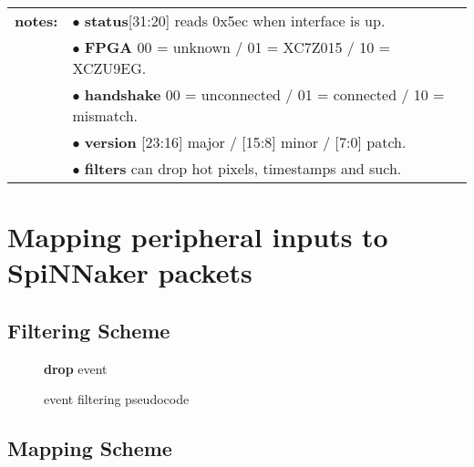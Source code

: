 \documentclass[11pt,a4paper,twoside]{article}
\begin{document}
\begin{center}
	\begin{tabularx}{\textwidth}{| l X |}
		\hline
		\textbf{notes:} & $\bullet$ \textbf{status}[31:20] reads 0x5ec when interface is up.              \\%
		                & $\bullet$ \textbf{FPGA} 00 = unknown / 01 = XC7Z015 / 10 = XCZU9EG.             \\%
		                & $\bullet$ \textbf{handshake} 00 = unconnected / 01 = connected / 10 = mismatch. \\%
		                & $\bullet$ \textbf{version} [23:16] major / [15:8] minor / [7:0] patch.          \\%
		                & $\bullet$ \textbf{filters} can drop hot pixels, timestamps and such.            \\%
		\hline
	\end{tabularx}
\end{center}


\clearpage
\section{Mapping peripheral inputs to SpiNNaker packets}


\subsection{Filtering Scheme}


\begin{figure}[!ht]
	\centering
	\begin{minipage}{0.75\columnwidth}
		\begin{algorithm}[H]
			\caption{event filtering pseudocode}
			\begin{algorithmic}[1]
						\State \textbf{drop} event
					\EndIf
				\EndFor
			\end{algorithmic}
			\label{alg:filter}
		\end{algorithm}
	\end{minipage}
\end{figure}


\subsection{Mapping Scheme}
\end{document}
